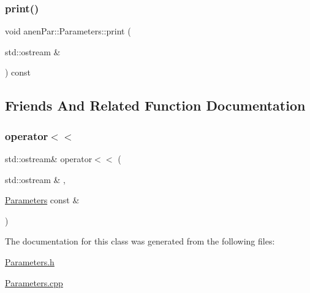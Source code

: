 \mbox{\label{classanen_par_1_1_parameters_acc1ebdd412b4b9d34e121fc0910c7952}} 
\subsubsection{\texorpdfstring{print()}{print()}}
{\footnotesize\ttfamily void anen\+Par\+::\+Parameters\+::print (\begin{DoxyParamCaption}\item[{std\+::ostream \&}]{ }\end{DoxyParamCaption}) const}



\subsection{Friends And Related Function Documentation}
\mbox{\label{classanen_par_1_1_parameters_a8ffabb0f94a5698a8a711fa5c449e622}} 
\subsubsection{\texorpdfstring{operator$<$$<$}{operator<<}}
{\footnotesize\ttfamily std\+::ostream\& operator$<$$<$ (\begin{DoxyParamCaption}\item[{std\+::ostream \&}]{,  }\item[{\mbox{\hyperlink{classanen_par_1_1_parameters}{Parameters}} const \&}]{ }\end{DoxyParamCaption})\hspace{0.3cm}{\ttfamily [friend]}}



The documentation for this class was generated from the following files\+:\begin{DoxyCompactItemize}
\item 
\mbox{\hyperlink{_parameters_8h}{Parameters.\+h}}\item 
\mbox{\hyperlink{_parameters_8cpp}{Parameters.\+cpp}}\end{DoxyCompactItemize}
